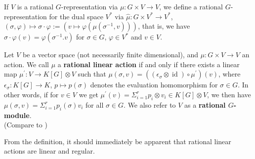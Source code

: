\begin{definition}\label{back}
  If $V$ is a rational $G$-representation via $\mu \colon G \times V \rightarrow V$, we define a rational $G$-representation for the dual space $V^\ast$ via $\hat{\mu} \colon G \times V^\ast \rightarrow V^\ast$, $(\sigma,\varphi) \mapsto \sigma\cdot\varphi := \left(v \mapsto \varphi(\mu(\sigma^{-1},v))\right)$, that is, we have $\sigma \cdot \varphi (v) = \varphi(\sigma^{-1}.v)$ for $\sigma \in G$, $\varphi \in V^\ast$ and $v \in V$.
\end{definition}



\begin{definition}\label{rr}
  Let $V$ be a vector space (not \linebreak necessarily finite dimensional), and $ \mu : G \times V \rightarrow V $ an action.
  We call $ \mu $ a \linebreak \textbf{rational linear action} if and only if there exists a linear map $ \mu^\prime \colon V \rightarrow K[G] \otimes V $ such that $ \mu \left( \sigma , v \right) = \left( \left( \epsilon_\sigma \otimes \operatorname{id} \right) \circ \mu^\prime \right) \left(v\right) $, where $\epsilon_\sigma \colon K[G] \rightarrow K$, $p \mapsto p(\sigma)$ denotes the evaluation homomorphism for $\sigma \in G$.
  In other words, if for $v \in V$ we get $\mu^\prime(v) = \Sigma_{i=1}^rp_i \otimes v_i \in K[G]\otimes V$, we then have $\mu(\sigma,v) = \Sigma_{i=1}^r p_i(\sigma)v_i$ for all $\sigma \in G$.
  We also refer to $V$ as a \textbf{rational $G$-module}.  \\
  (Compare to \cite[A.1.7]{DK15})
\end{definition}

\begin{remark}
  From the definition, it should immediately be apparent that \linebreak rational linear actions are linear and regular.
\end{remark}

